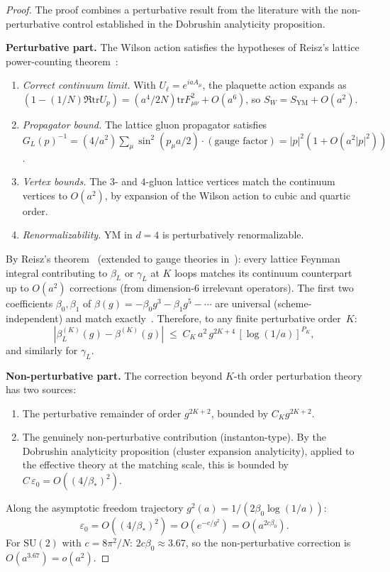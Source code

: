 \documentclass[11pt]{article}
\theoremstyle{definition}
\newcommand{\SU}{\mathrm{SU}}
\newcommand{\tr}{\mathrm{tr}}
\begin{document}
\begin{proof}
The proof combines a perturbative result from the
literature with the non-perturbative control established
in the Dobrushin analyticity proposition.

\smallskip
\noindent\textbf{Perturbative part.}
The Wilson action satisfies the hypotheses of Reisz's
lattice power-counting theorem~\cite{Reisz1988}:
\begin{enumerate}[label=(R\arabic*),nosep]
  \item \emph{Correct continuum limit.}
    With $U_\ell = e^{iaA_\mu}$, the plaquette action
    expands as $(1{-}(1/N)\Re\tr U_p)
    = (a^4/2N)\tr F_{\mu\nu}^2 + O(a^6)$,
    so $S_W = S_{\mathrm{YM}} + O(a^2)$.
  \item \emph{Propagator bound.}
    The lattice gluon propagator satisfies
    $G_L(p)^{-1} = (4/a^2)\sum_\mu \sin^2(p_\mu a/2)
    \cdot(\text{gauge factor})
    = |p|^2(1 + O(a^2|p|^2))$.
  \item \emph{Vertex bounds.}
    The $3$- and $4$-gluon lattice vertices match the
    continuum vertices to $O(a^2)$, by expansion of the
    Wilson action to cubic and quartic order.
  \item \emph{Renormalizability.}
    YM in $d = 4$ is perturbatively renormalizable.
\end{enumerate}
By Reisz's theorem~\cite{Reisz1988}
(extended to gauge theories in~\cite{Reisz89}):
every lattice Feynman integral contributing to
$\beta_L$ or $\gamma_L$ at $K$ loops matches its
continuum counterpart up to $O(a^2)$ corrections
(from dimension-$6$ irrelevant operators).
The first two coefficients $\beta_0, \beta_1$ of
$\beta(g) = -\beta_0 g^3 - \beta_1 g^5 - \cdots$ are
universal (scheme-independent) and match
exactly~\cite{Luscher_Weisz}.
Therefore, to any finite perturbative order~$K$:
\begin{equation}\label{syn-eq:pert_matching}
  |\beta_L^{(K)}(g) - \beta^{(K)}(g)|
  \;\leq\; C_K\,a^2\,g^{2K+4}\,[\log(1/a)]^{P_K},
\end{equation}
and similarly for $\gamma_L$.

\smallskip
\noindent\textbf{Non-perturbative part.}
The correction beyond $K$-th order perturbation theory
has two sources:
\begin{enumerate}[label=(\roman*),nosep]
  \item The perturbative remainder of order $g^{2K+2}$,
    bounded by $C_K g^{2K+2}$.
  \item The genuinely non-perturbative contribution
    (instanton-type).  By
    the Dobrushin analyticity proposition (cluster expansion
    analyticity), applied to the effective theory at the
    matching scale, this is bounded by
    $C\,\varepsilon_0 = O((4/\beta_*)^2)$.
\end{enumerate}
Along the asymptotic freedom trajectory
$g^2(a) = 1/(2\beta_0\log(1/a))$:
\begin{equation}
  \varepsilon_0 = O((4/\beta_*)^2)
  = O(e^{-c/g^2}) = O(a^{2c\beta_0}).
\end{equation}
For $\SU(2)$ with $c = 8\pi^2/N$:
$2c\beta_0 \approx 3.67$, so the non-perturbative
correction is $O(a^{3.67}) = o(a^2)$.


\end{proof}
\end{document}
